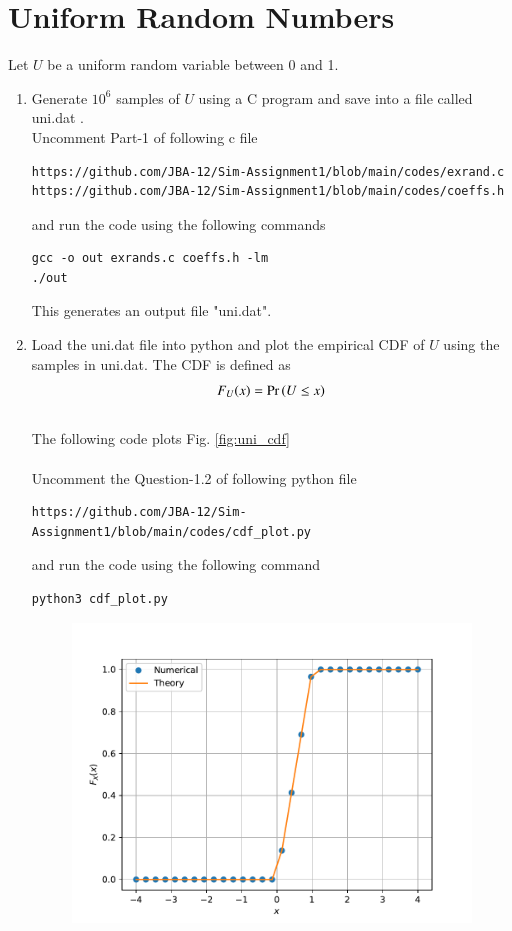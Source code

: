 \documentclass[journal,12pt,twocolumn]{IEEEtran}
\renewcommand\thesection{\arabic{section}}
\begin{document}
\section{Uniform Random Numbers}
Let $U$ be a uniform random variable between 0 and 1.
\begin{enumerate}[label=\thesection.\arabic*
,ref=\thesection.\theenumi]
\item Generate $10^6$ samples of $U$ using a C program and save into a file called uni.dat .
\\
\solution
Uncomment Part-1 of following c file
\begin{lstlisting}
https://github.com/JBA-12/Sim-Assignment1/blob/main/codes/exrand.c
https://github.com/JBA-12/Sim-Assignment1/blob/main/codes/coeffs.h
\end{lstlisting}
and run the code using the following commands
\begin{lstlisting}
gcc -o out exrands.c coeffs.h -lm
./out
\end{lstlisting}
This generates an output file "uni.dat".\\
%
\item
Load the uni.dat file into python and plot the empirical CDF of $U$ using the samples in uni.dat. The CDF is defined as
\begin{align}
F_{U}(x) = \Pr\left(U \le x\right)
\end{align}
\\
\solution  The following code plots Fig. \ref{fig:uni_cdf}\\\\
Uncomment the Question-1.2 of following python file
\begin{lstlisting}
https://github.com/JBA-12/Sim-Assignment1/blob/main/codes/cdf_plot.py
\end{lstlisting}
and run the code using the following command
\begin{lstlisting}
python3 cdf_plot.py
\end{lstlisting}
\begin{figure}[!htbp]
\centering
\includegraphics[width=\columnwidth]{./figs/uni_cdf}

\end{figure}
\end{enumerate}
\end{document}
